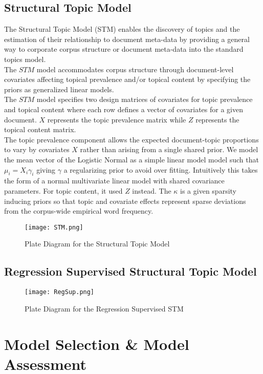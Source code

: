 \documentclass[9pt,notitlepage]{article}		%
\begin{document}
\subsection{Structural Topic Model}
The Structural Topic Model (STM) enables the discovery of topics and the estimation of their relationship to document meta-data by providing a general way to corporate corpus  structure or document meta-data into the standard topics model.\\
The $STM$ model accommodates corpus structure through document-level covariates affecting topical prevalence and/or topical content by specifying the priors as generalized linear models.\\
The $STM$ model specifies two design matrices of covariates for topic prevalence and topical content where each row defines a vector of covariates for a given document. $X$ represents the topic prevalence matrix while $Z$ represents the topical content matrix.\\
The topic prevalence component allows the expected document-topic proportions to vary by covariates $X$ rather than arising from a single shared prior. We model the mean vector of the Logistic Normal as a simple linear model model such that $\mu_i=X_i\gamma_i$ giving $\gamma$ a regularizing prior to avoid over fitting. Intuitively this takes the form of a normal multivariate linear model with shared covariance parameters. For topic content, it used $Z$ instead. The $\kappa$ is a given sparsity inducing priors so that topic and covariate effects represent sparse deviations from the corpus-wide empirical word frequency.
\begin{figure}[ht!]
\centering
\texttt{[image: STM.png]}
\caption{Plate Diagram for the Structural Topic Model}
\end{figure}
\FloatBarrier

\subsection{Regression Supervised Structural Topic Model}

\begin{figure}[ht!]
\centering
\texttt{[image: RegSup.png]}
\caption{Plate Diagram for the Regression Supervised STM}
\end{figure}
\FloatBarrier
 \hspace{0.5cm} \vspace{0.5cm}
\section{Model Selection \& Model Assessment}
\end{document}

